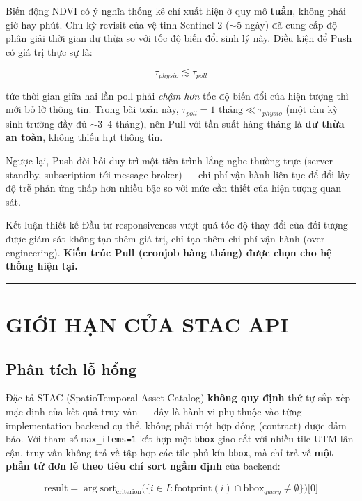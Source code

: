 \documentclass[12pt,a4paper]{report}
\begin{document}
Biến động NDVI có ý nghĩa thống kê chỉ xuất hiện ở quy mô \textbf{tuần}, không phải giờ hay phút. Chu kỳ revisit của vệ tinh Sentinel-2 ($\sim$5 ngày) đã cung cấp độ phân giải thời gian dư thừa so với tốc độ biến đổi sinh lý này. Điều kiện để Push có giá trị thực sự là:

\begin{equation}
    \tau_{physio} \lesssim \tau_{poll}
\end{equation}

tức thời gian giữa hai lần poll phải \textit{chậm hơn} tốc độ biến đổi của hiện tượng thì mới bỏ lỡ thông tin. Trong bài toán này, $\tau_{poll} = 1\text{ tháng} \ll \tau_{physio}$ (một chu kỳ sinh trưởng đầy đủ $\sim$3--4 tháng), nên Pull với tần suất hàng tháng là \textbf{dư thừa an toàn}, không thiếu hụt thông tin.

Ngược lại, Push đòi hỏi duy trì một tiến trình lắng nghe thường trực (server standby, subscription tới message broker) — chi phí vận hành liên tục để đổi lấy độ trễ phản ứng thấp hơn nhiều bậc so với mức cần thiết của hiện tượng quan sát.

\begin{resultbox}{Kết luận thiết kế}
Đầu tư responsiveness vượt quá tốc độ thay đổi của đối tượng được giám sát không tạo thêm giá trị, chỉ tạo thêm chi phí vận hành (over-engineering). \textbf{Kiến trúc Pull (cronjob hàng tháng) được chọn cho hệ thống hiện tại.}
\end{resultbox}

\noindent\rule{\textwidth}{0.4pt}

\section{GIỚI HẠN CỦA STAC API}

\subsection{Phân tích lỗ hổng}

Đặc tả STAC (SpatioTemporal Asset Catalog) \textbf{không quy định} thứ tự sắp xếp mặc định của kết quả truy vấn — đây là hành vi phụ thuộc vào từng implementation backend cụ thể, không phải một hợp đồng (contract) được đảm bảo. Với tham số \texttt{max\_items=1} kết hợp một \texttt{bbox} giao cắt với nhiều tile UTM lân cận, truy vấn không trả về tập hợp các tile phủ kín \texttt{bbox}, mà chỉ trả về \textbf{một phần tử đơn lẻ theo tiêu chí sort ngầm định} của backend:

\begin{equation}
    \text{result} = \arg\text{sort}_{\text{criterion}}\Big(\big\{i \in I : \text{footprint}(i) \cap \text{bbox}_{query} \neq \emptyset\big\}\Big)\big[0]
\end{equation}
\end{document}
